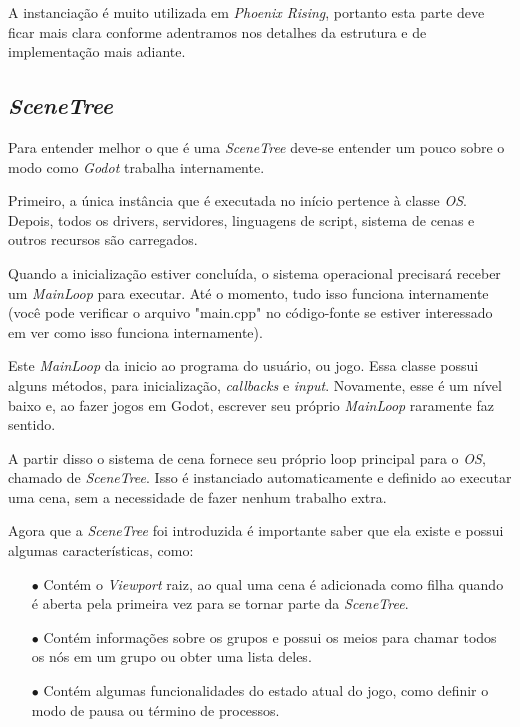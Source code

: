 A instanciação é muito utilizada em \textit{Phoenix Rising}, portanto esta
parte deve ficar mais clara conforme adentramos nos detalhes da estrutura e
de implementação mais adiante.

\subsection{\textit{SceneTree}}

Para entender melhor o que é uma \textit{SceneTree} deve-se entender um pouco 
sobre o modo como \textit{Godot} trabalha internamente.

Primeiro, a única instância que é executada no 
início pertence à classe \textit{OS}. Depois, todos os drivers, servidores,
linguagens de script, sistema de cenas e outros recursos são carregados.

Quando a inicialização estiver concluída, o sistema operacional precisará 
receber um \textit{MainLoop} para executar. Até o momento, tudo isso funciona 
internamente (você pode verificar o arquivo "main.cpp" no código-fonte se 
estiver interessado em ver como isso funciona internamente).

Este \textit{MainLoop} da inicio ao programa do usuário, ou jogo. Essa classe
possui alguns métodos, para inicialização, \textit{callbacks} e \textit{input}. 
Novamente, esse é um nível baixo e, ao fazer jogos em Godot, escrever seu 
próprio \textit{MainLoop} raramente faz sentido.

A partir disso o sistema de cena fornece seu próprio loop principal para o 
\textit{OS}, chamado de \textit{SceneTree}. 
Isso é instanciado automaticamente e definido ao executar uma cena, sem a 
necessidade de fazer nenhum trabalho extra.

Agora que a \textit{SceneTree} foi introduzida é importante saber que ela existe
e possui algumas características, como:

\begin{itemize}
    \item[$\bullet$]
        Contém o \textit{Viewport} raiz, ao qual uma cena é adicionada 
        como filha quando é aberta pela primeira vez para se tornar parte da
        \textit{SceneTree}.
    \item[$\bullet$]
        Contém informações sobre os grupos e possui os meios para chamar 
        todos os nós em um grupo ou obter uma lista deles.
    \item[$\bullet$]
        Contém algumas funcionalidades do estado atual do
        jogo, como definir o modo de pausa ou término de processos.
\end{itemize}

